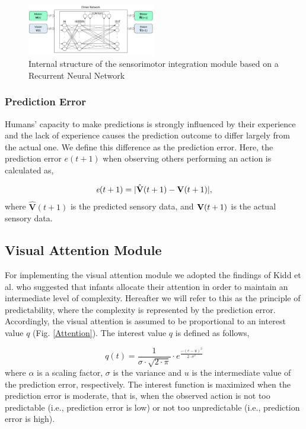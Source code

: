 \documentclass[conference]{IEEEtran}
\begin{document}
\begin{figure}[!t]
\centering
\includegraphics[width=0.5\textwidth,natwidth=700,natheight=450]{Elman_Network.png}
\caption{Internal structure of the sensorimotor integration module based on a Recurrent Neural Network}
\label{NeuralNet}
\end{figure}

\subsubsection{Prediction Error}
 Humans' capacity to make predictions is strongly influenced by their experience and the lack of experience causes the prediction outcome to differ largely from the actual one. We define this difference as the prediction error. Here, the prediction error \(\textit{e}(t+1)\) when observing others performing an action is calculated as,

\begin{equation}
\begin{split}
	\textit{e}(t+1)=|\hat{\textbf{V}}(t+1)-\text{\textbf{V}}(t+1)|,\\
\end{split}
\end{equation}
where \(\hat{\textbf{V}}(t+1)\) is the predicted sensory data, and \(\text{\textbf{V}}(t+1)\) is the actual sensory data.

\subsection{Visual Attention Module}
For implementing the visual attention module we adopted the findings of Kidd et al. \cite{kidd2012goldilocks} who suggested that infants allocate their attention in order to maintain an intermediate level of complexity. Hereafter we will refer to this as the principle of predictability, where the complexity is represented by the prediction error. Accordingly, the visual attention is assumed to be proportional to an interest value \(\textit{q}\) (Fig. \ref{Attention}). The interest value \(\textit{q}\) is defined as follows,

\begin{equation}
  \textit{q}(t) = \frac{1}{\sigma\cdot \sqrt{2\cdot\pi}}\cdot e^{\frac{-(\textit{e}-\textit{u})^2}{2\cdot\sigma^2}}
  \label{gaussian}
\end{equation}
where \(\alpha\) is a scaling factor, \(\sigma\) is the variance and \(\textit{u}\) is the intermediate value of the prediction error, respectively. The interest function is maximized when the prediction error is moderate, that is, when the observed action is not too predictable (i.e., prediction error is low) or not too unpredictable (i.e., prediction error is high). 
\end{document}

